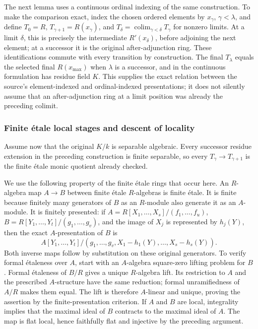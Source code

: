 The next lemma uses a continuous ordinal indexing of the same construction. To make the comparison exact, index the chosen ordered elements by \(x_\gamma\), \(\gamma<\lambda\), and define \(T_0=R\), \(T_{\gamma+1}=R(x_\gamma)\), and \(T_\delta=\operatorname*{colim}_{\gamma<\delta}T_\gamma\) for nonzero limits. At a limit \(\delta\), this is precisely the intermediate \(R'(x_\delta)\), before adjoining the next element; at a successor it is the original after-adjunction ring. These identifications commute with every transition by construction. The final \(T_\lambda\) equals the selected final \(R(x_{\max})\) when \(\lambda\) is a successor, and in the continuous formulation has residue field \(K\). This supplies the exact relation between the source's element-indexed and ordinal-indexed presentations; it does not silently assume that an after-adjunction ring at a limit position was already the preceding colimit.

\subsubsection{Finite étale local stages and descent of locality}\label{algebra-proof-064-finite-uxe9tale-local-stages-and-descent-of-locality}

Assume now that the original \(K/k\) is separable algebraic. Every successor residue extension in the preceding construction is finite separable, so every \(T_\gamma\to T_{\gamma+1}\) is the finite étale monic quotient already checked.

We use the following property of the finite étale rings that occur here. An \(R\)-algebra map \(A\to B\) between finite étale \(R\)-algebras is finite étale. It is finite because finitely many generators of \(B\) as an \(R\)-module also generate it as an \(A\)-module. It is finitely presented: if \(A=R[X_1,\ldots,X_s]/(f_1,\ldots,f_u)\), \(B=R[Y_1,\ldots,Y_t]/(g_1,\ldots,g_v)\), and the image of \(X_j\) is represented by \(h_j(Y)\), then the exact \(A\)-presentation of \(B\) is \[
 A[Y_1,\ldots,Y_t]/(g_1,\ldots,g_v,X_1-h_1(Y),\ldots,X_s-h_s(Y)).
\] Both inverse maps follow by substitution on these original generators. To verify formal étaleness over \(A\), start with an \(A\)-algebra square-zero lifting problem for \(B\). Formal étaleness of \(B/R\) gives a unique \(R\)-algebra lift. Its restriction to \(A\) and the prescribed \(A\)-structure have the same reduction; formal unramifiedness of \(A/R\) makes them equal. The lift is therefore \(A\)-linear and unique, proving the assertion by the finite-presentation criterion. If \(A\) and \(B\) are local, integrality implies that the maximal ideal of \(B\) contracts to the maximal ideal of \(A\). The map is flat local, hence faithfully flat and injective by the preceding argument.


